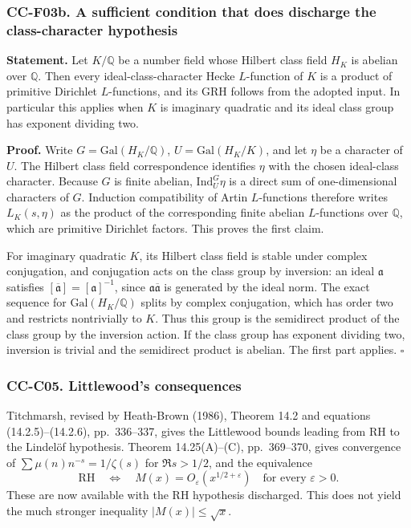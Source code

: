 \subsubsection{CC-F03b. A sufficient condition that does discharge the
class-character
hypothesis}\label{cc-f03b.-a-sufficient-condition-that-does-discharge-the-class-character-hypothesis}

\textbf{Statement.} Let \(K/\mathbb Q\) be a number field whose Hilbert
class field \(H_K\) is abelian over \(\mathbb Q\). Then every
ideal-class-character Hecke \(L\)-function of \(K\) is a product of
primitive Dirichlet \(L\)-functions, and its GRH follows from the
adopted input. In particular this applies when \(K\) is imaginary
quadratic and its ideal class group has exponent dividing two.

\textbf{Proof.} Write \(G=\mathrm{Gal}(H_K/\mathbb Q)\),
\(U=\mathrm{Gal}(H_K/K)\), and let \(\eta\) be a character of \(U\). The
Hilbert class field correspondence identifies \(\eta\) with the chosen
ideal-class character. Because \(G\) is finite abelian,
\(\mathrm{Ind}_U^G\eta\) is a direct sum of one-dimensional characters
of \(G\). Induction compatibility of Artin \(L\)-functions therefore
writes \(L_K(s,\eta)\) as the product of the corresponding finite
abelian \(L\)-functions over \(\mathbb Q\), which are primitive
Dirichlet factors. This proves the first claim.

For imaginary quadratic \(K\), its Hilbert class field is stable under
complex conjugation, and conjugation acts on the class group by
inversion: an ideal \(\mathfrak a\) satisfies
\([\overline{\mathfrak a}]=[\mathfrak a]^{-1}\), since
\(\mathfrak a\overline{\mathfrak a}\) is generated by the ideal norm.
The exact sequence for \(\mathrm{Gal}(H_K/\mathbb Q)\) splits by complex
conjugation, which has order two and restricts nontrivially to \(K\).
Thus this group is the semidirect product of the class group by the
inversion action. If the class group has exponent dividing two,
inversion is trivial and the semidirect product is abelian. The first
part applies. \(\square\)

\subsubsection{CC-C05. Littlewood's
consequences}\label{cc-c05.-littlewoods-consequences}

Titchmarsh, revised by Heath-Brown (1986), Theorem 14.2 and equations
(14.2.5)--(14.2.6), pp.~336--337, gives the Littlewood bounds leading
from RH to the Lindelöf hypothesis. Theorem 14.25(A)--(C), pp.~369--370,
gives convergence of \(\sum\mu(n)n^{-s}=1/\zeta(s)\) for \(\Re s>1/2\),
and the equivalence \[
 \mathrm{RH}\quad\Longleftrightarrow\quad
 M(x)=O_\varepsilon(x^{1/2+\varepsilon})
 \quad\text{for every }\varepsilon>0.
\] These are now available with the RH hypothesis discharged. This does
not yield the much stronger inequality \(|M(x)|\le\sqrt{x}\).


